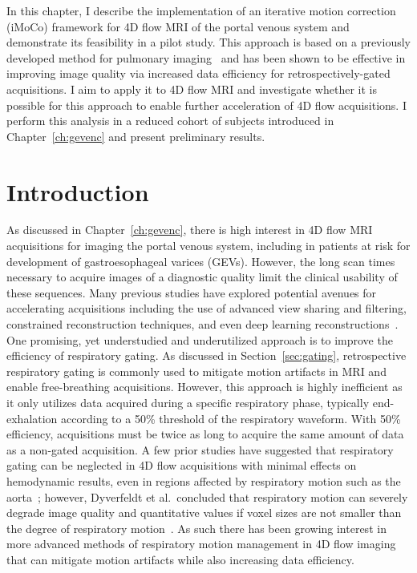 In this chapter, I describe the implementation of an iterative motion correction (iMoCo) framework for 4D flow MRI of the portal venous system and demonstrate its feasibility in a pilot study. This approach is based on a previously developed method for pulmonary imaging~\cite{zhuIterativeMotioncompensationReconstruction2020} and has been shown to be effective in improving image quality via increased data efficiency for retrospectively-gated acquisitions. I aim to apply it to 4D flow MRI and investigate whether it is possible for this approach to enable further acceleration of 4D flow acquisitions. I perform this analysis in a reduced cohort of subjects introduced in Chapter~\ref{ch:gevenc} and present preliminary results.

\section{Introduction}\label{sec:imoco_intro}
As discussed in Chapter~\ref{ch:gevenc}, there is high interest in 4D flow MRI acquisitions for imaging the portal venous system, including in patients at risk for development of gastroesophageal varices (GEVs). However, the long scan times necessary to acquire images of a diagnostic quality limit the clinical usability of these sequences. Many previous studies have explored potential avenues for accelerating acquisitions including the use of advanced view sharing and filtering, constrained reconstruction techniques, and even deep learning reconstructions~\cite{rastegarjooybariHighlyAccelerated4D2025,pruittFullySelfgatedWholeheart2021,akcakayaFreebreathingPhaseContrast2014,chengComprehensiveMotioncompensatedHighly2016,valvanoAccelerating4DFlow2017,santelliAccelerating4DFlow2016}. One promising, yet understudied and underutilized approach is to improve the efficiency of respiratory gating. As discussed in Section~\ref{sec:gating}, retrospective respiratory gating is commonly used to mitigate motion artifacts in MRI and enable free-breathing acquisitions. However, this approach is highly inefficient as it only utilizes data acquired during a specific respiratory phase, typically end-exhalation according to a 50\% threshold of the respiratory waveform. With 50\% efficiency, acquisitions must be twice as long to acquire the same amount of data as a non-gated acquisition. A few prior studies have suggested that respiratory gating can be neglected in 4D flow acquisitions with minimal effects on hemodynamic results, even in regions affected by respiratory motion such as the aorta~\cite{valverdeSystemictopulmonaryCollateralFlow2012,kanskiWholeheartFourdimensionalFlow2015}; however, Dyverfeldt et al.\ concluded that respiratory motion can severely degrade image quality and quantitative values if voxel sizes are not smaller than the degree of respiratory motion~\cite{dyverfeldtComparisonRespiratoryMotion2017,wangRespiratoryMotionHeart1995}. As such there has been growing interest in more advanced methods of respiratory motion management in 4D flow imaging that can mitigate motion artifacts while also increasing data efficiency.

